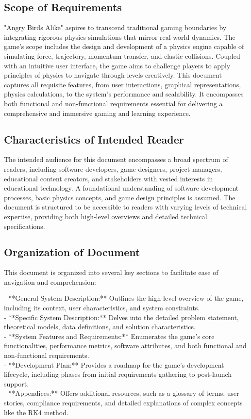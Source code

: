 \documentclass[12pt]{article}
\begin{document}
\subsection{Scope of Requirements}
"Angry Birds Alike" aspires to transcend traditional gaming boundaries by integrating rigorous physics simulations that mirror real-world dynamics. The game's scope includes the design and development of a physics engine capable of simulating force, trajectory, momentum transfer, and elastic collisions. Coupled with an intuitive user interface, the game aims to challenge players to apply principles of physics to navigate through levels creatively. This document captures all requisite features, from user interactions, graphical representations, physics calculations, to the system's performance and scalability. It encompasses both functional and non-functional requirements essential for delivering a comprehensive and immersive gaming and learning experience.

\subsection{Characteristics of Intended Reader}
The intended audience for this document encompasses a broad spectrum of readers, including software developers, game designers, project managers, educational content creators, and stakeholders with vested interests in educational technology. A foundational understanding of software development processes, basic physics concepts, and game design principles is assumed. The document is structured to be accessible to readers with varying levels of technical expertise, providing both high-level overviews and detailed technical specifications.

\subsection{Organization of Document}
This document is organized into several key sections to facilitate ease of navigation and comprehension:

- **General System Description:** Outlines the high-level overview of the game, including its context, user characteristics, and system constraints.\\
- **Specific System Description:** Delves into the detailed problem statement, theoretical models, data definitions, and solution characteristics.\\
- **System Features and Requirements:** Enumerates the game's core functionalities, performance metrics, software attributes, and both functional and non-functional requirements.\\
- **Development Plan:** Provides a roadmap for the game's development lifecycle, including phases from initial requirements gathering to post-launch support.\\
- **Appendices:** Offers additional resources, such as a glossary of terms, user stories, compliance requirements, and detailed explanations of complex concepts like the RK4 method.
\end{document}
